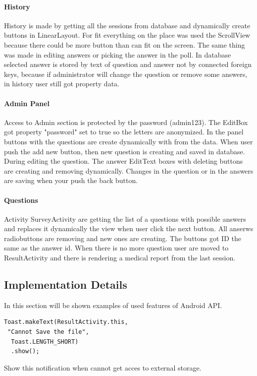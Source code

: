 \documentclass[conference]{IEEEtran}
\begin{document}
\paragraph{History} History is made by getting all the sessions from database and dynamically create buttons in LinearLayout. For fit everything on the place was used the ScrollView because there could be more button than can fit on the screen. The same thing was made in editing answers or picking the answer in the poll. In database selected answer is stored by text of question and answer not by connected foreign keys, because if administrator will change the question or remove some answers, in history user still got property data.

\paragraph{Admin Panel} Access to Admin section is protected by the password (admin123). The EditBox got property "password" set to true so the letters are anonymized. In the panel buttons with the questions are create dynamically with from the data. When user push the add new button, then new question is creating and saved in database. During editing the question. The answer EditText boxes with deleting buttons are creating and removing dynamically. Changes in the question or in the answers are saving when your push the back button.

\paragraph{Questions} Activity SurveyActivity are getting the list of a questions with possible answers and replaces it dynamically the view when user click the next button. All anserws radiobuttons are removing and new ones are creating. The buttons got ID the same as the answer id. When there is no more question user are moved to ResultActivity and there is rendering a medical report from the last session.

\subsection{Implementation Details}
In this section will be shown examples of used features of Android API.


\begin{lstlisting}[frame=single]
Toast.makeText(ResultActivity.this,
 "Cannot Save the file",
  Toast.LENGTH_SHORT)
  .show();
\end{lstlisting}
Show this notification when cannot get acces to external storage.\\
\end{document}
